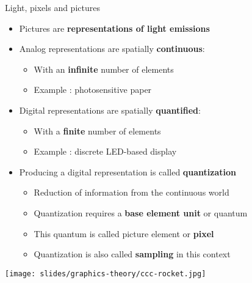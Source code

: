 \begin{frame}{Light, pixels and pictures}
  \begin{minipage}{0.75\textwidth}
  \begin{itemize}
  \item Pictures are {\bf representations of light emissions}
  \item Analog representations are spatially {\bf continuous}:
    \begin{itemize}
    \item With an {\bf infinite} number of elements
    \item Example : photosensitive paper
    \end{itemize}
  \item Digital representations are spatially {\bf quantified}:
    \begin{itemize}
    \item With a {\bf finite} number of elements
    \item Example : discrete LED-based display
    \end{itemize}
  \item Producing a digital representation is called \textbf{quantization}
    \begin{itemize}
    \item Reduction of information from the continuous world
    \item Quantization requires a {\bf base element unit} or quantum
    \item This quantum is called picture element or {\bf pixel}
    \item Quantization is also called \textbf{sampling} in this context
    \end{itemize}
  \end{itemize}
  \end{minipage}%
  \begin{minipage}{0.25\textwidth}
  \texttt{[image: slides/graphics-theory/ccc-rocket.jpg]}
  \end{minipage}
\end{frame}

